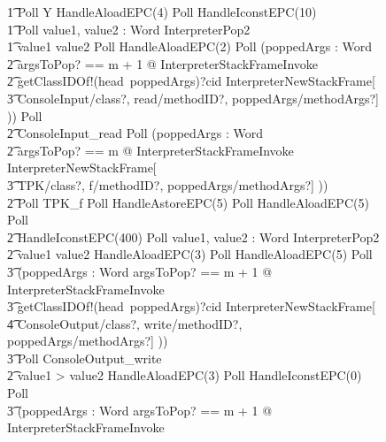 \begin{figure}
\begin{circus}
    \t1 Poll \circseq \circmu Y \circspot HandleAloadEPC(4) \circseq Poll \circseq HandleIconstEPC(10) \circseq \\
    \t1 Poll \circseq \circvar value1, value2 : Word \circspot InterpreterPop2 \circseq \\
    \t1 \circif value1 \leq value2 \circseq Poll \circseq HandleAloadEPC(2) \circseq Poll \circseq  (\circvar poppedArgs : \seq Word \circspot \\
    \t2 \lschexpract \exists argsToPop? == m + 1 @ InterpreterStackFrameInvoke \rschexpract \circseq \\
    \t2 getClassIDOf!(head~poppedArgs)?cid \then \lschexpract InterpreterNewStackFrame[ \\
    \t3 ConsoleInput/class?, read/methodID?, poppedArgs/methodArgs?] \rschexpract)) \circseq Poll \circseq \\
    \t2 ConsoleInput\_read \circseq Poll \circseq (\circvar poppedArgs : \seq Word \circspot \\
    \t2 \lschexpract \exists argsToPop? == m @ InterpreterStackFrameInvoke \rschexpract \circseq \lschexpract InterpreterNewStackFrame[\\
    \t3 TPK/class?, f/methodID?, poppedArgs/methodArgs?] \rschexpract)) \circseq \\
    \t2 Poll \circseq TPK\_f  \circseq Poll \circseq HandleAstoreEPC(5) \circseq Poll \circseq HandleAloadEPC(5) \circseq Poll \circseq \\
    \t2 HandleIconstEPC(400) \circseq Poll \circseq \circvar value1, value2 : Word \circspot InterpreterPop2 \circseq \\
    \t2 \circif value1 \leq value2 \circthen HandleAloadEPC(3) \circseq Poll \circseq HandleAloadEPC(5) \circseq Poll \circseq \\
    \t3 (\circvar poppedArgs : \seq Word \circspot \lschexpract \exists argsToPop? == m + 1 @ InterpreterStackFrameInvoke \rschexpract \circseq \\
    \t3 getClassIDOf!(head~poppedArgs)?cid \then \lschexpract InterpreterNewStackFrame[ \\
    \t4 ConsoleOutput/class?, write/methodID?, poppedArgs/methodArgs?] \rschexpract)) \circseq \\
    \t3 Poll \circseq ConsoleOutput\_write \\
    \t2 {} \circelse value1 > value2 \circthen HandleAloadEPC(3) \circseq Poll \circseq HandleIconstEPC(0) \circseq Poll \circseq \\
    \t3 (\circvar poppedArgs : \seq Word \circspot \lschexpract \exists argsToPop? == m + 1 @ InterpreterStackFrameInvoke \rschexpract \circseq \\

\end{circus}
\end{figure}

